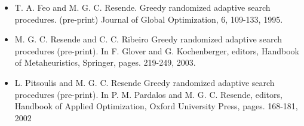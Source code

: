 \begin{itemize}
	\item T. A. Feo and M. G. C. Resende. Greedy randomized adaptive search procedures. (pre-print) Journal of Global Optimization, 6, 109-133, 1995.
	\item M. G. C. Resende and C. C. Ribeiro Greedy randomized adaptive search procedures (pre-print). In F. Glover and G. Kochenberger, editors, Handbook of Metaheuristics, Springer, pages. 219-249, 2003.
	\item L. Pitsoulis and M. G. C. Resende Greedy randomized adaptive search procedures (pre-print). In P. M. Pardalos and M. G. C. Resende, editors, Handbook of Applied Optimization, Oxford University Press, pages. 168-181, 2002
\end{itemize}

